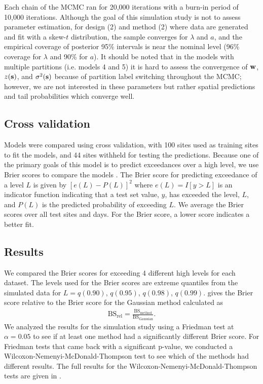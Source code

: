 \documentclass[useAMS,usenatbib,referee]{biom}
\begin{document}
Each chain of the MCMC ran for 20,000 iterations with a burn-in period of 10,000 iterations.
Although the goal of this simulation study is not to assess parameter estimation, for design (2) and method (2) where data are generated and fit with a skew-$t$ distribution, the sample converges for $\lambda$ and $a$, and the empirical coverage of posterior 95\% intervals is near the nominal level (96\% coverage for $\lambda$ and 90\% for $a$).
It should be noted that in the models with multiple partitions (i.e. models 4 and 5) it is hard to assess the convergence of $\mbox{\bf w}$, $z(\mbox{\bf s})$, and $\sigma^2(\mbox{\bf s})$ because of partition label switching throughout the MCMC; however, we are not interested in these parameters but rather spatial predictions and tail probabilities which converge well.

\subsection{Cross validation}\label{sts:modelselect}
Models were compared using cross validation, with 100 sites used as training sites to fit the models, and 44 sites withheld for testing the predictions.
Because one of the primary goals of this model is to predict exceedances over a high level, we use Brier scores to compare the models \citep{Gneiting2007}.
The Brier score for predicting exceedance of a level $L$ is given by $[e(L) - P(L)]^2$ where $e(L) = I[y>L]$ is an indicator function indicating that a test set value, $y$, has exceeded the level, $L$, and $P(L)$ is the predicted probability of exceeding $L$.
We average the Brier scores over all test sites and days.
For the Brier score, a lower score indicates a better fit.

\subsection{Results}\label{sts:simresults}
We compared the Brier scores for exceeding 4 different high levels for each dataset.
The levels used for the Brier scores are extreme quantiles from the simulated data for $L = q(0.90)$, $q(0.95)$, $q(0.98)$, $q(0.99)$.
 gives the Brier score relative to the Brier score for the Gaussian method calculated as
\begin{align}
  \text{BS}_{\text{rel}} = \frac{\text{BS}_{\text{method}}}{\text{BS}_{\text{Gaussian}}}.
\end{align}
We analyzed the results for the simulation study using a Friedman \citep{Hollander2014} test at $\alpha = 0.05$ to see if at least one method had a significantly different Brier score.
For Friedman tests that came back with a significant p-value, we conducted a Wilcoxon-Nemenyi-McDonald-Thompson \citep{Hollander2014} test to see which of the methods had different results.
The full results for the Wilcoxon-Nemenyi-McDonald-Thompson tests are given in .
\end{document}
